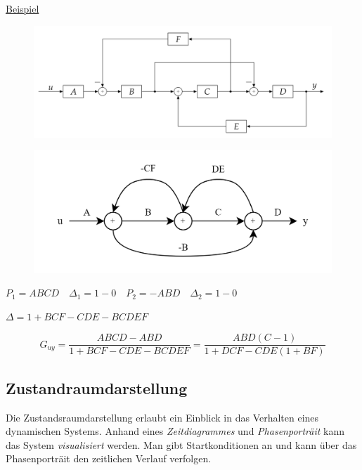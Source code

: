 \documentclass[
  10pt,
  a4paper,
  twocolumn]{article}
\numberwithin{equation}{section}
\begin{document}
\ul{Beispiel}

\begin{figure}[H]

{\centering \includegraphics{images/paste-65.png}

}

\end{figure}

\begin{figure}[H]

{\centering \includegraphics{images/paste-66.png}

}

\end{figure}

\(P_1 = ABCD \quad \Delta_1 = 1-0\quad P_2 = -ABD \quad \Delta_2=1-0\)

\(\Delta=1+BCF-CDE-BCDEF\)

\small

\[
G_{uy}=\frac{ABCD-ABD}{1+BCF-CDE-BCDEF}=\frac{ABD(C-1)}{1+DCF-CDE(1+BF)}
\]

\normalsize

\newpage

\hypertarget{zustandraumdarstellung}{%
\subsection{Zustandraumdarstellung}\label{zustandraumdarstellung}}

Die Zustandsraumdarstellung erlaubt ein Einblick in das Verhalten eines
dynamischen Systems. Anhand eines \emph{Zeitdiagrammes} und
\emph{Phasenporträit} kann das System \emph{visualisiert} werden. Man
gibt Startkonditionen an und kann über das Phasenporträit den zeitlichen
Verlauf verfolgen.
\end{document}
